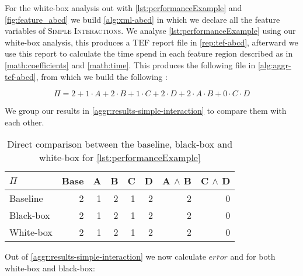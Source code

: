 For the white-box analysis out with \autoref{lst:performanceExample} and \autoref{fig:feature_abcd} we build \autoref{alg:xml-abcd} 
in which we declare all the feature variables of \textsc{Simple Interactions}. 
We analyse \autoref{lst:performanceExample} using our white-box analysis, this produces a TEF report file in \autoref{rep:tef-abcd},
afterward we use this report to calculate the time spend in each feature region described as in \autoref{math:coefficients} and \autoref{math:time}.
This produces the following file in \autoref{alg:aggr-tef-abcd}, from which we build the following {\perfInfluenceModel}:

\begin{equation}
    \Pi = 2 + 1 \cdot A + 2 \cdot B + 1 \cdot C + 2 \cdot D + 2 \cdot A \cdot B + 0 \cdot C \cdot D
\end{equation}

We group our results in \autoref{aggr:results-simple-interaction} to compare them with each other.

\begin{table}[H]
    \centering
    \begin{tabular}{lrrrrrrr}
    \toprule
    $\Pi$    & Base & A & B & C & D & A $\land$ B & C $\land$ D  \\ \midrule
    Baseline & 2    & 1 & 2 & 1 & 2 & 2           & 0            \\
    Black-box & 2    & 1 & 2 & 1 & 2 & 2           & 0           \\
    White-box & 2    & 1 & 2 & 1 & 2 & 2           & 0           \\ \bottomrule
    \end{tabular}  
    \caption{Direct comparison between the baseline, black-box and white-box {\perfInfluenceModel} for \autoref{lst:performanceExample}}\label{aggr:results-simple-interaction}
\end{table}

Out of \autoref{aggr:results-simple-interaction} we now calculate $\overline{error}$ and %
for both white-box and black-box:

